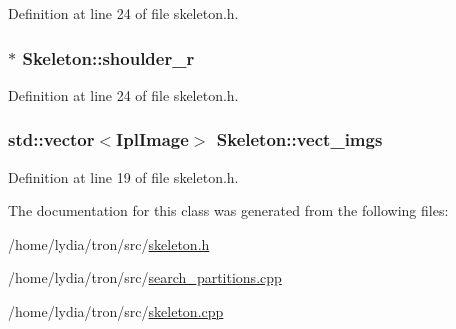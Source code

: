 Definition at line 24 of file skeleton.\+h.

\hypertarget{class_skeleton_a6646dc69bf5eeace8db045b1521c3329}{
\subsubsection[{shoulder\+\_\+r}]{$\ast$ Skeleton\+::shoulder\+\_\+r}}\label{class_skeleton_a6646dc69bf5eeace8db045b1521c3329}


Definition at line 24 of file skeleton.\+h.

\hypertarget{class_skeleton_a823010dbe6f31708e0e3f9fae9ddbcbb}{
\subsubsection[{vect\+\_\+imgs}]{\setlength{\rightskip}{0pt plus 5cm}std\+::vector$<$Ipl\+Image$>$ Skeleton\+::vect\+\_\+imgs}}\label{class_skeleton_a823010dbe6f31708e0e3f9fae9ddbcbb}


Definition at line 19 of file skeleton.\+h.



The documentation for this class was generated from the following files\+:\begin{DoxyCompactItemize}
\item 
/home/lydia/tron/src/\hyperlink{skeleton_8h}{skeleton.\+h}\item 
/home/lydia/tron/src/\hyperlink{search__partitions_8cpp}{search\+\_\+partitions.\+cpp}\item 
/home/lydia/tron/src/\hyperlink{skeleton_8cpp}{skeleton.\+cpp}\end{DoxyCompactItemize}
